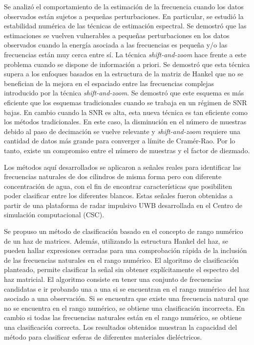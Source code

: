 Se analizó el comportamiento de la estimación de la frecuencia cuando los datos observados están sujetos a pequeñas perturbaciones. En particular, se estudió la estabilidad  numérica de las técnicas de estimación espectral. Se demostró que las estimaciones se vuelven vulnerables a pequeñas perturbaciones en los datos observados cuando la energía asociada a las frecuencias es pequeña y/o las frecuencias están muy cerca entre sí. La   técnica \emph{shift-and-zoom} hace frente a este problema cuando se dispone de información a priori. Se demostró que esta técnica supera a los enfoques basados en la estructura de la matriz de Hankel que no se benefician de la mejora en el espaciado entre las frecuencias complejas introducido por la  técnica \emph{shift-and-zoom}. Se demostró que este esquema es más eficiente que los esquemas tradicionales cuando se trabaja en un régimen de SNR bajas. En cambio cuando la SNR es alta, esta nueva técnica es tan eficiente como los métodos tradicionales. En este caso, la disminución en el número de muestras debido al paso de decimación se vuelve relevante y \emph{shift-and-zoom} requiere una cantidad de datos más grande para converger a límite de Cramér-Rao. Por lo tanto, existe un compromiso entre el número de muestras y el factor de diezmado. 

Los métodos aquí desarrollados se aplicaron a señales reales para identificar las frecuencias naturales de dos cilindros de misma forma pero con diferente concentración de agua, con el fin de encontrar características que posibiliten poder clasificar entre los diferentes blancos. Estas señales fueron obtenidas a partir de una plataforma de radar impulsivo UWB desarrollada en el Centro de simulación computacional (CSC).

Se propuso un método de clasificación basado en el concepto de rango numérico de un haz de matrices. Además, utilizando la estructura Hankel del haz, se pueden hallar expresiones cerradas para una comprobación rápida de la inclusión de las frecuencias naturales en el rango numérico. El algoritmo de clasificación planteado, permite clasificar la señal sin obtener explícitamente el espectro del haz matricial. El algoritmo consiste en tener una conjunto de frecuencias candidatas e ir probando una a una si se encuentran en el rango numérico del haz asociado a una observación. Si se encuentra que existe una frecuencia natural que no se encuentra en el rango numérico, se obtiene una clasificación incorrecta. En cambio si todas las frecuencias naturales están en el rango numérico, se obtiene una clasificación correcta. Los resultados obtenidos muestran la capacidad del método para clasificar esferas de diferentes materiales dieléctricos. 

